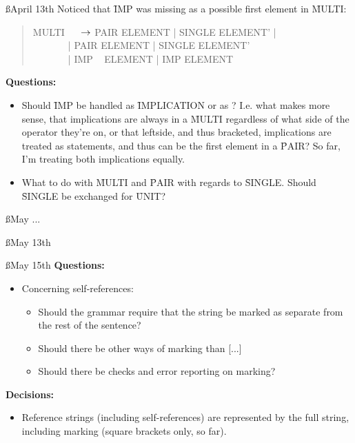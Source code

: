 \documentclass[a4paper]{article}
\begin{document}
\ss{April 13th}
Noticed that \f{IMP} was missing as a possible first element in \f{MULTI}:
\begin{quote}
\ttfamily
MULTI \(~~~~~~\)$\rightarrow$ PAIR \: ELEMENT |
                      SINGLE  ELEMENT' |\\
\(~~~~~~~~~~~~~~~\) | PAIR  ELEMENT  |
                      SINGLE  ELEMENT'\\
\(~~~~~~~~~~~~~~~\) | IMP ~ ELEMENT  |
                      IMP  ELEMENT\\
\end{quote}

{\bf Questions:}
\begin{itemize}
    \item Should \f{IMP} be handled as \f{IMPLICATION} or as ? I.e.
    what makes more sense, that implications are always in a \f{MULTI} 
    regardless of what side of the operator they're on, or that leftside,
    and thus bracketed, implications are treated as statements, and thus 
    can be the first element in a \f{PAIR}?
    So far, I'm treating both implications equally.

    \item What to do with \f{MULTI} and \f{PAIR} with regards to \f{SINGLE}.
    Should \f{SINGLE} be exchanged for \f{UNIT}?
\end{itemize}

\ss{May ...}

\ss{May 13th}

\ss{May 15th}
{\bf Questions:}
  \begin{itemize}
    \item Concerning self-references:
      \begin{itemize}
        \item Should the grammar require that the string be marked as 
        separate from the rest of the sentence?
        \item Should there be other ways of marking than [...]
        \item Should there be checks and error reporting on marking?
      \end{itemize}
  \end{itemize}

{\bf Decisions:}
  \begin{itemize}
    \item Reference strings (including self-references) are represented by 
    the full string, including marking (square brackets only, so far).
  \end{itemize}
\end{document}
